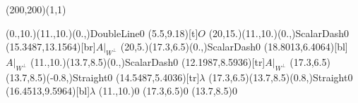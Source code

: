 \unitlength=1bp%

\begin{feynartspicture}(200,200)(1,1)

\FADiagram{}
\FAProp(0.,10.)(11.,10.)(0.,){DoubleLine}{0}
\FALabel(5.5,9.18)[t]{$O$}
\FAProp(20,15.)(11.,10.)(0.,){ScalarDash}{0}
\FALabel(15.3487,13.1564)[br]{$A|_{W^\perp}$}
\FAProp(20,5.)(17.3,6.5)(0.,){ScalarDash}{0}
\FALabel(18.8013,6.4064)[bl]{$A|_{W^\perp}$}
\FAProp(11.,10.)(13.7,8.5)(0.,){ScalarDash}{0}
\FALabel(12.1987,8.5936)[tr]{$A|_{W^\perp}$}
\FAProp(17.3,6.5)(13.7,8.5)(-0.8,){Straight}{0}
\FALabel(14.5487,5.4036)[tr]{$\lambda$}
\FAProp(17.3,6.5)(13.7,8.5)(0.8,){Straight}{0}
\FALabel(16.4513,9.5964)[bl]{$\lambda$}
\FAVert(11.,10.){0}
\FAVert(17.3,6.5){0}
\FAVert(13.7,8.5){0}
\end{feynartspicture}

